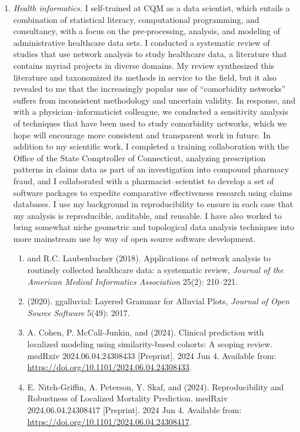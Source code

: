 \documentclass{nihbiosketch}
\begin{document}
\begin{enumerate}
\item \emph{Health informatics.}
I self-trained at CQM as a data scientist, which entails a combination of statistical literacy, computational programming, and consultancy, with a focus on the pre-processing, analysis, and modeling of administrative healthcare data sets.
I conducted a systematic review of studies that use network analysis to study healthcare data, a literature that contains myriad projects in diverse domains. My review synthesized this literature and taxonomized its methods in service to the field, but it also revealed to me that the increasingly popular use of ``comorbidity networks'' suffers from inconsistent methodology and uncertain validity. In response, and with a physician--informaticist colleague, we conducted a sensitivity analysis of techniques that have been used to study comorbidity networks, which we hope will encourage more consistent and transparent work in future.
In addition to my scientific work, I completed a training collaboration with the Office of the State Comptroller of Connecticut, analyzing prescription patterns in claims data as part of an investigation into compound pharmacy fraud, and I collaborated with a pharmacist--scientist to develop a set of software packages to expedite comparative effectiveness research using claims databases.
I use my background in reproducibility to ensure in each case that my analysis is reproducible, auditable, and reusable. I have also worked to bring somewhat niche geometric and topological data analysis techniques into more mainstream use by way of open source software development.

\begin{enumerate}
\item {} and R.C. Laubenbacher (2018). Applications of network analysis to routinely collected healthcare data: a systematic review, \emph{Journal of the American Medical Informatics Association} 25(2): 210--221.
\item {} (2020). ggalluvial: Layered Grammar for Alluvial Plots, \emph{Journal of Open Source Software} 5(49): 2017.
\item A. Cohen, P. McCall-Junkin, and  (2024). Clinical prediction with localized modeling using similarity-based cohorts: A scoping review. medRxiv 2024.06.04.24308433 [Preprint]. 2024 Jun 4.  Available from: \url{https://doi.org/10.1101/2024.06.04.24308433}.
\item E. Nitch-Griffin, A. Peterson, Y. Skaf, and  (2024). Reproducibility and Robustness of Localized Mortality Prediction. medRxiv 2024.06.04.24308417 [Preprint]. 2024 Jun 4.  Available from: \url{https://doi.org/10.1101/2024.06.04.24308417}.
\end{enumerate}


\end{enumerate}
\end{document}
